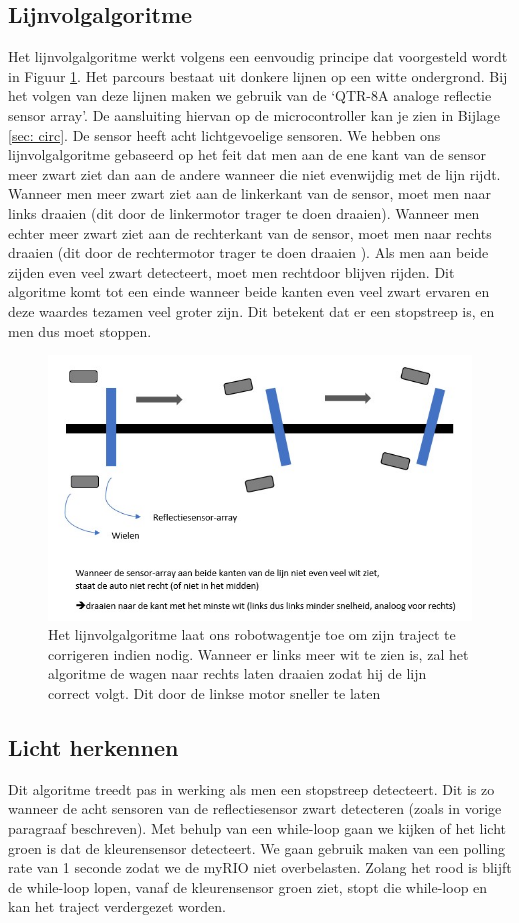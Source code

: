 \documentclass[a4paper,twoside,kulak]{kulakreport}
\begin{document}
\subsection{Lijnvolgalgoritme}
Het lijnvolgalgoritme werkt volgens een eenvoudig principe dat voorgesteld wordt in Figuur \ref{fig: lijnvolg}.
Het parcours bestaat uit donkere lijnen op een witte ondergrond. Bij het volgen van deze lijnen maken we gebruik van de `QTR-8A analoge reflectie sensor array'.
De aansluiting hiervan op de microcontroller kan je zien in Bijlage \ref{sec: circ}. De sensor heeft acht lichtgevoelige sensoren. We hebben ons lijnvolgalgoritme gebaseerd op het feit dat men aan de ene kant van de sensor meer zwart ziet dan aan de andere wanneer die niet evenwijdig met de lijn rijdt. Wanneer men meer zwart ziet aan de linkerkant van de sensor, moet men naar links draaien (dit door de linkermotor trager te doen draaien). Wanneer men echter meer zwart ziet aan de rechterkant van de sensor, moet men naar rechts draaien (dit door de rechtermotor trager te doen draaien ). Als men aan beide zijden even veel zwart detecteert, moet men rechtdoor blijven rijden. Dit algoritme komt tot een einde wanneer beide kanten even veel zwart ervaren en deze waardes tezamen veel groter zijn. Dit betekent dat er een stopstreep is, en men dus moet stoppen. 

\begin{figure}
	\centering
	\includegraphics[width=.84\textwidth]{pref2}
	\caption{Het lijnvolgalgoritme laat ons robotwagentje toe om zijn traject te corrigeren indien nodig. Wanneer er links meer wit te zien is, zal het algoritme de wagen naar rechts laten draaien zodat hij de lijn correct volgt. Dit door de linkse motor sneller te laten  }
	\label{fig: lijnvolg}
	
\end{figure}
\subsection{Licht herkennen}
Dit algoritme treedt pas in werking als men een stopstreep detecteert. Dit is zo wanneer de acht sensoren van de reflectiesensor zwart detecteren (zoals in vorige paragraaf beschreven). Met behulp van een while-loop gaan we kijken of het licht groen is dat de kleurensensor detecteert. We gaan gebruik maken van een polling rate van 1 seconde zodat we de myRIO niet overbelasten. Zolang het rood is blijft de while-loop lopen, vanaf de kleurensensor groen ziet, stopt die while-loop en kan het traject verdergezet worden.
\end{document}
